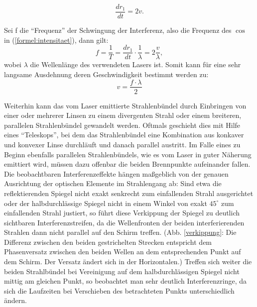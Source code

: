 \begin{equation}
\frac{d r_{1}}{d t} = 2 v.
\end{equation}

Sei f die \enquote{Frequenz} der Schwingung der Interferenz, also die Frequenz des $ \cos $ in (\ref{formel:intensitaet}), dann gilt: 
\begin{equation}
f = \frac{1}{T} = \frac{d r_{1}}{d t} \cdot \frac{1}{\lambda} = 2 \frac{v}{\lambda},
\end{equation}
wobei $ \lambda $ die Wellenlänge des verwendeten Lasers ist. 
Somit kann für eine sehr langsame Ausdehnung deren Geschwindigkeit bestimmt werden zu: 
\begin{equation}
v = \frac{f \cdot \lambda}{2}
\end{equation}


Weiterhin kann das vom Laser emittierte Strahlenbündel durch Einbringen von einer oder mehrerer Linsen zu einem divergenten Strahl oder einem breiteren, parallelen Strahlenbündel gewandelt werden. Oftmals geschieht dies mit Hilfe eines \enquote{Teleskops}, bei dem das Strahlenbündel eine Kombination aus konkaver und konvexer Linse durchläuft und danach parallel austritt. Im Falle eines zu Beginn ebenfalls parallelen Strahlenbündels, wie es vom Laser in guter Näherung emittiert wird, müssen dazu offenbar die beiden Brennpunkte aufeinander fallen.  \\

Die beobachtbaren Interferenzeffekte hängen maßgeblich von der genauen Ausrichtung der optischen Elemente im Strahlengang ab: 
Sind etwa die reflektierenden Spiegel nicht exakt senkrecht zum einfallenden Strahl ausgerichtet oder der halbdurchlässige Spiegel nicht in einem Winkel von exakt $ 45 ^\circ$  zum einfallenden Strahl justiert, so führt diese Verkippung der Spiegel zu deutlich sichtbaren Interferenzstreifen, da die Wellenfronten der beiden interferierenden Strahlen dann nicht parallel auf den Schirm treffen. (Abb. \ref{verkippung}: Die Differenz zwischen den beiden gestrichelten Strecken entspricht dem Phasenversatz zwischen den beiden Wellen an dem entsprechenden Punkt auf dem Schirm. Der Versatz ändert sich in der Horizontalen.) Treffen sich weiter die beiden Strahlbündel bei Vereinigung auf dem halbdurchlässigen Spiegel nicht mittig am gleichen Punkt, so beobachtet man sehr deutlich Interferenzringe, da sich die Laufzeiten bei Verschieben des betrachteten Punkts unterschiedlich ändern. 


